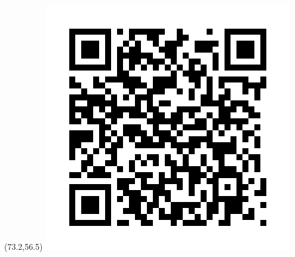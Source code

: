 \documentclass[final,hyperref={pdfpagelabels=false}]{beamer}
\begin{document}
\begin{frame}{}
\begin{columns}
\begin{column}{0.07\linewidth}
\end{column}%
  \end{columns}
\begin{textblock}{14}(73.2,56.5)
\includegraphics[trim=40 40 40 40,clip,scale=.52]{./img/QR.png}
\end{textblock}
\end{frame}
\end{document}
